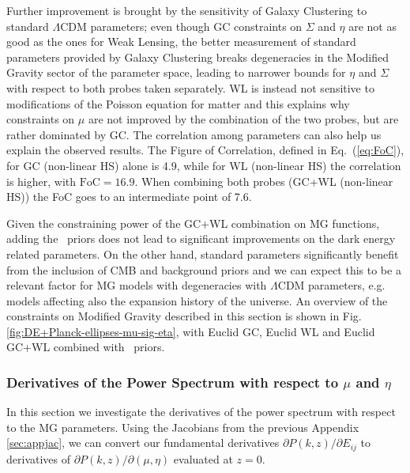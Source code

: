 Further improvement is brought by the sensitivity of Galaxy Clustering to standard $\Lambda$CDM parameters; even
though GC constraints on $\Sigma$ and $\eta$ are not as good as the ones for Weak Lensing, the better measurement of standard parameters provided by Galaxy Clustering breaks degeneracies in the Modified Gravity sector of the parameter space, leading to
narrower bounds for $\eta$ and $\Sigma$ with respect to both probes taken separately. WL is instead not sensitive to modifications of the Poisson equation for matter and this explains why constraints on $\mu$ are not improved
by the combination of the two probes, but are rather dominated by
GC. 
The correlation among parameters can also help us explain the observed results. 
The Figure of Correlation, defined in Eq.\ (\ref{eq:FoC}), for GC (non-linear HS) alone is 4.9, while
for WL (non-linear HS) the correlation is higher, with $\textrm{FoC}=16.9$.
When combining both probes (GC+WL (non-linear HS)) the FoC goes to an intermediate point of 7.6.

Given the constraining power of the GC+WL combination on MG functions, adding the \planck\ priors does not lead to significant improvements on the dark energy related parameters. On the other hand, standard parameters significantly benefit
from the inclusion of CMB and background priors and we can expect
this to be a relevant factor for MG models with degeneracies
with $\Lambda$CDM parameters, e.g. models affecting also the expansion
history of the universe.
An overview of the constraints on Modified Gravity described in this section is shown in Fig.\ref{fig:DE+Planck-ellipses-mu-sig-eta}, with Euclid GC, Euclid WL and Euclid GC+WL combined with \planck\ priors.


\subsubsection{Derivatives of the Power Spectrum with respect to $\mu$ and $\eta$}\label{sec:appder}

In this section we investigate the derivatives of the power spectrum with respect to the MG parameters. 
Using the Jacobians from the previous Appendix \ref{sec:appjac}, we can convert 
our fundamental derivatives $\partial P(k,z)/\partial E_{ij}$ to derivatives of $\partial P(k,z)/\partial (\mu, \eta)$ evaluated at $z=0$.


